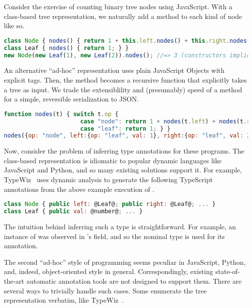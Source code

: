 \label{infer:chapter:intro}

%

Consider the exercise of counting binary tree nodes using JavaScript.
With a class-based tree representation, we naturally add a method
to each kind of node like so.

\begin{lstlisting}[language=JavaScript]
class Node { nodes() { return 1 + this.left.nodes() + this.right.nodes(); } }
class Leaf { nodes() { return 1; } }
new Node(new Leaf(1), new Leaf(2)).nodes(); //=> 3 (constructors implicit)
\end{lstlisting}

An alternative ``ad-hoc'' representation uses plain JavaScript Objects
with explicit tags.
Then, the method becomes a recursive function that explicitly takes a tree as input.
We trade the extensiblility and (presumably) speed of a method for a simple, reversible serialization to JSON.

\begin{lstlisting}[language=JavaScript]
function nodes(t) { switch t.op { 
                      case "node": return 1 + nodes(t.left) + nodes(t.right);
                      case "leaf": return 1; } }
nodes({op: "node", left:{op: "leaf", val: 1}, right:{op: "leaf", val: 2}})//=>3
\end{lstlisting}

Now, consider the problem of inferring type annotations for these programs.
The class-based representation is idiomatic to popular dynamic languages
like JavaScript and Python, and so many existing solutions support it.
For example, TypeWiz~ uses dynamic analysis to generate
the following TypeScript annotations from the above example execution of .

\begin{lstlisting}[language=JavaScript]
class Node { public left: @Leaf@; public right: @Leaf@; ... }
class Leaf { public val: @number@; ... }
\end{lstlisting}

The intuition behind inferring such a type is straightforward.
For example, an instance of  was observed in 's  field,
and so the nominal type  is used for its annotation.

The second ``ad-hoc'' style of programming seems peculiar in JavaScript, Python, and, indeed,
object-oriented style in general.
Correspondingly, existing state-of-the-art automatic annotation tools are not designed
to support them.
There are several ways to trivially handle such cases.
Some enumerate the tree representation verbatim, like TypeWiz~.

